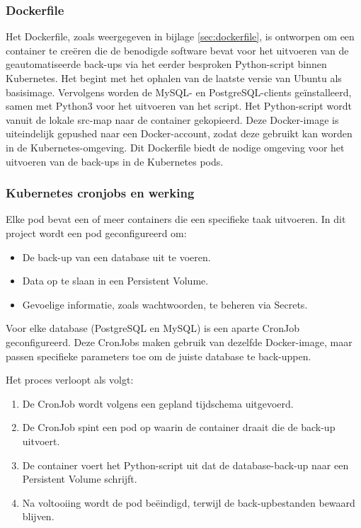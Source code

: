 \subsubsection{Dockerfile}
Het Dockerfile, zoals weergegeven in bijlage \ref{sec:dockerfile}, is ontworpen om een container te creëren die de benodigde software bevat voor het uitvoeren van de geautomatiseerde back-ups via het eerder besproken Python-script binnen Kubernetes. Het begint met het ophalen van de laatste versie van Ubuntu als basisimage. Vervolgens worden de MySQL- en PostgreSQL-clients geïnstalleerd, samen met Python3 voor het uitvoeren van het script. Het Python-script wordt vanuit de lokale src-map naar de container gekopieerd. Deze Docker-image is uiteindelijk gepushed naar een Docker-account, zodat deze gebruikt kan worden in de Kubernetes-omgeving. Dit Dockerfile biedt de nodige omgeving voor het uitvoeren van de back-ups in de Kubernetes pods.


\subsubsection{Kubernetes cronjobs en werking}
Elke pod bevat een of meer containers die een specifieke taak uitvoeren. In dit project wordt een pod geconfigureerd om:
\begin{itemize}
    \item De back-up van een database uit te voeren.
    \item Data op te slaan in een Persistent Volume.
    \item Gevoelige informatie, zoals wachtwoorden, te beheren via Secrets.
\end{itemize}

Voor elke database (PostgreSQL en MySQL) is een aparte CronJob geconfigureerd. Deze CronJobs maken gebruik van dezelfde Docker-image, maar passen specifieke parameters toe om de juiste database te back-uppen.

Het proces verloopt als volgt:
\begin{enumerate}
    \item De CronJob wordt volgens een gepland tijdschema uitgevoerd.
    \item De CronJob spint een pod op waarin de container draait die de back-up uitvoert.
    \item De container voert het Python-script uit dat de database-back-up naar een Persistent Volume schrijft.
    \item Na voltooiing wordt de pod beëindigd, terwijl de back-upbestanden bewaard blijven.
\end{enumerate}

